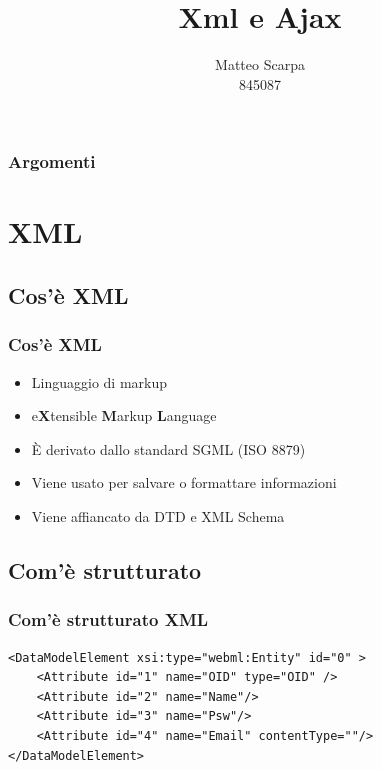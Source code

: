 \documentclass{beamer}
\title{Xml e Ajax}
\author{Matteo Scarpa\\ 845087}
\date{}
\institute{Università Ca'Foscari}
\begin{document}
\begin{frame}
   \maketitle
\end{frame}

\begin{frame}
   \frametitle{Argomenti}
   \tableofcontents[pausesections]
\end{frame}

\section{XML}

\subsection{Cos'è XML}
\begin{frame}
    \frametitle{Cos'è XML}
    \begin{itemize}
        \item Linguaggio di markup
        \item e\textbf{X}tensible \textbf{M}arkup \textbf{L}anguage
        \item È derivato dallo standard SGML (ISO 8879)
        \item Viene usato per salvare o formattare informazioni
        \item Viene affiancato da DTD e XML Schema
    \end{itemize}
\end{frame}

\subsection{Com'è strutturato}

\begin{frame}[fragile]
    \frametitle{Com'è strutturato XML}
    \begin{verbatim}
<DataModelElement xsi:type="webml:Entity" id="0" >       
    <Attribute id="1" name="OID" type="OID" /> 
    <Attribute id="2" name="Name"/> 
    <Attribute id="3" name="Psw"/> 
    <Attribute id="4" name="Email" contentType=""/> 
</DataModelElement> 
    \end{verbatim}
\end{frame}
\end{document}
